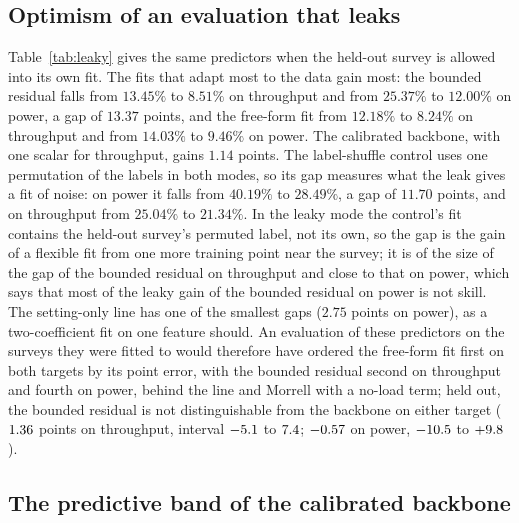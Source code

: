 \subsection{Optimism of an evaluation that leaks}\label{sec:results-leaky}

Table~\ref{tab:leaky} gives the same predictors when the held-out survey is allowed into its own fit. The fits that adapt most to the data gain
most: the bounded residual falls from $13.45\%$ to $8.51\%$ on throughput and from $25.37\%$ to $12.00\%$ on power, a gap of $13.37$ points, and the
free-form fit from $12.18\%$ to $8.24\%$ on throughput and from $14.03\%$ to $9.46\%$ on power. The calibrated backbone, with one scalar for
throughput, gains $1.14$ points. The label-shuffle control uses one permutation of the labels in both modes, so its gap measures what the leak
gives a fit of noise: on power it falls from $40.19\%$ to $28.49\%$, a gap of $11.70$ points, and on throughput from $25.04\%$ to $21.34\%$. In the
leaky mode the control's fit contains the held-out survey's permuted label, not its own, so the gap is the gain of a flexible fit from one more
training point near the survey; it is of the size of the gap of the bounded residual on throughput and close to that on power, which says that
most of the leaky gain of the bounded residual on power is not skill. The setting-only line has one of the smallest gaps ($2.75$ points on
power), as a two-coefficient fit on one feature should. An evaluation of these predictors on the surveys they were fitted to would therefore
have ordered the free-form fit first on both targets by its point error, with the bounded residual second on throughput and fourth on power,
behind the line and Morrell with a no-load term; held out, the bounded residual is not distinguishable from the backbone on either target
($1.36$ points on throughput, interval $-5.1$ to $7.4$; $-0.57$ on power, $-10.5$ to $+9.8$).

\begin{table}[!t]
\centering
\caption{MAPE in percent of every predictor with the held-out survey outside its fit (strict) and inside it (leaky), and their difference in points,
on the same ten surveys and folds. Generated from \texttt{loo.json}.}
\label{tab:leaky}
\footnotesize

\end{table}

\subsection{The predictive band of the calibrated backbone}\label{sec:results-band}

